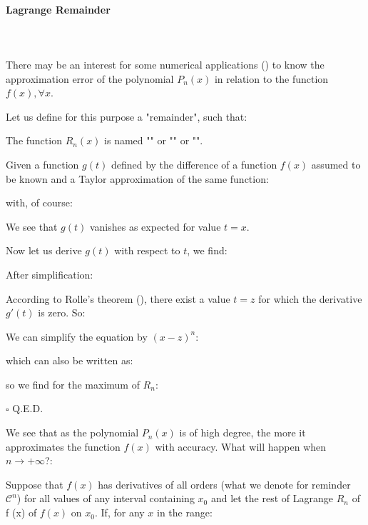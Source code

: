 	\paragraph{Lagrange Remainder}\mbox{}\\\\
	There may be an interest for some numerical applications () to know the approximation error of the polynomial $P_n(x)$ in relation to the function $f(x), \forall x$.
	
	Let us define for this purpose a "remainder", such that:
	
	\begin{theorem}
	The function $R_n(x)$ is named "" or "" or "".
	
	\end{theorem}
	
	\begin{dem}
	Given a function $g(t)$ defined by the difference of a function $f(x)$ assumed to be known and a Taylor approximation of the same function:
	
	with, of course:
	
	We see that $g (t)$ vanishes as expected for value $t=x$.
	
	Now let us derive $g(t)$ with respect to $t$, we find:
	
	After simplification:
	
	According to Rolle's theorem (), there exist a value $t=z$ for which the derivative $g'(t)$ is zero. So:
	
	We can simplify the equation by $(x-z)^n$:
	
	which can also be written as:
	
	so we find for the maximum of $R_n$:
	
	\begin{flushright}
		$\square$  Q.E.D.
	\end{flushright}
	\end{dem}
	We see that as the polynomial $P_n(x)$ is of high degree, the more it approximates the function $f (x)$ with accuracy. What will happen when $n\rightarrow +\infty$?:
	
	Suppose that $f (x)$ has derivatives of all orders (what we denote for reminder $\mathcal{C}^n$) for all values of any interval containing $x_0$ and let the rest of Lagrange $R_n$ of f (x) of $f(x)$ on $x_0$. If, for any $x$ in the range:
	

